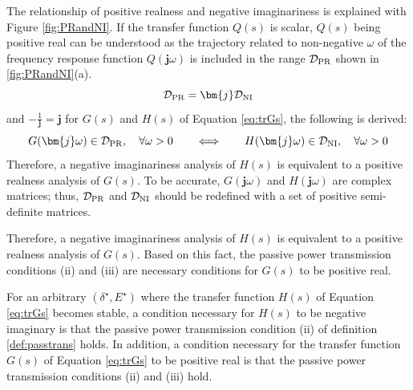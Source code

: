\documentclass[graybox, envcountchap]{svmult}
\begin{document}
The relationship of positive realness and negative imaginariness is explained with Figure \ref{fig:PRandNI}.
If the transfer function $Q(s)$ is scalar, $Q(s)$ being positive real can be understood as the trajectory related to non-negative $\omega$ of the frequency response function $Q(\bm{j} \omega)$ is included in the range $\mathcal{D}_{\rm PR}$ shown in \ref{fig:PRandNI}(a).
\[
\mathcal{D}_{\rm PR} = \bm{j} \mathcal{D}_{\rm NI}
\]
and $-\tfrac{1}{\bm{j}}=\bm{j}$ for $G(s)$ and $H(s)$ of Equation \ref{eq:trGs}, the following is derived:
\[
G(\bm{j} \omega) \in \mathcal{D}_{\rm PR}, 
\quad \forall \omega >0
\qquad
\Longleftrightarrow
\qquad
H(\bm{j} \omega) \in \mathcal{D}_{\rm NI} ,
\quad \forall \omega >0
\]
Therefore, a negative imaginariness analysis of $H(s)$ is equivalent to a positive realness analysis of $G(s)$.
To be accurate, $G(\bm{j} \omega)$ and $H(\bm{j} \omega)$ are complex matrices; thus, $\mathcal{D}_{\rm PR}$ and $\mathcal{D}_{\rm NI}$ should be redefined with a set of positive semi-definite matrices.

Therefore, a negative imaginariness analysis of $H(s)$ is equivalent to a positive realness analysis of $G(s)$. Based on this fact, the passive power transmission conditions (ii) and (iii) are necessary conditions for $G(s)$ to be positive real.

\begin{定理}
\label{thm:EdynNI}
For an arbitrary $(\delta^{\star},E^{\star})$ where the transfer function $H(s)$ of Equation \ref{eq:trGs} becomes stable, a condition necessary for $H(s)$ to be negative imaginary is that the passive power transmission condition (ii) of definition \ref{def:passtrans} holds.
In addition, a condition necessary for the transfer function $G(s)$ of Equation \ref{eq:trGs} to be positive real is that the passive power transmission conditions (ii) and (iii) hold.
\end{定理}
\end{document}
